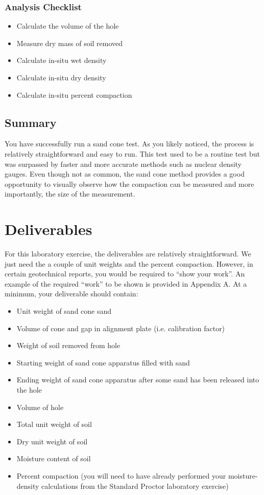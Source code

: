 \documentclass[12pt]{article}
\begin{document}
\subsubsection*{Analysis Checklist}
\begin{itemize}
    \item Calculate the volume of the hole
    \item Measure dry mass of soil removed
    \item Calculate in-situ wet density
    \item Calculate in-situ dry density
    \item Calculate in-situ percent compaction
\end{itemize}

\subsection{Summary}
You have successfully run a sand cone test. As you likely noticed, the process is relatively straightforward and easy to run. This test used to be a routine test but was surpassed by faster and more accurate methods such as nuclear density gauges. Even though not as common, the sand cone method provides a good opportunity to visually observe how the compaction can be measured and more importantly, the size of the measurement.

\pagebreak
\section{Deliverables}
For this laboratory exercise, the deliverables are relatively straightforward. We just need the a couple of unit weights and the percent compaction. However, in certain geotechnical reports, you would be required to ``show your work''. An example of the required ``work'' to be shown is provided in Appendix A. At a minimum, your deliverable should contain:
\begin{itemize}
    \item Unit weight of sand cone sand
    \item Volume of cone and gap in alignment plate (i.e. calibration factor)
    \item Weight of soil removed from hole
    \item Starting weight of sand cone apparatus filled with sand
    \item Ending weight of sand cone apparatus after some sand has been released into the hole
    \item Volume of hole
    \item Total unit weight of soil
    \item Dry unit weight of soil
    \item Moisture content of soil
    \item Percent compaction (you will need to have already performed your moisture-density calculations from the Standard Proctor laboratory exercise)
\end{itemize}
\end{document}
